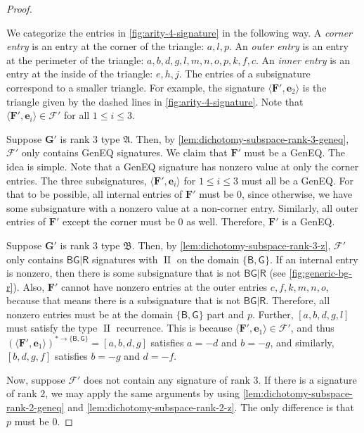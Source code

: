 \documentclass[11pt]{article}
\DeclareMathOperator{\typeii}{II}
\newcommand{\db}{\mathsf{B}}
\newcommand{\dg}{\mathsf{G}}
\newcommand{\dr}{\mathsf{R}}
\newcommand{\geneq}{\textsf{GenEQ}\xspace}
\newcommand{\domres}[1]{
  ^{*\to\{#1\}}
}
\newcommand{\ternarytractgeneq}{$\mathfrak{A}$\xspace}
\newcommand{\ternarytractz}{$\mathfrak{B}$\xspace}
\begin{document}
\begin{proof}
\begin{figure}
\end{figure}
We categorize the entries in  \cref{fig:arity-4-signature} in the following way.
A \textit{corner entry} is an entry at the corner of the triangle: $a, l, p$.
An \textit{outer entry} is an entry at the perimeter of the triangle: 
$a,b,d,g,l,m,n,o,p,k,f,c$.
An \textit{inner entry} is an entry at the inside of the triangle: $e, h , j$.
The entries of a subsignature correspond to a smaller 
triangle. 
For example, the signature $\langle \mathbf{F}', \mathbf{e}_2 \rangle$ is  
the  triangle given by  the dashed lines in \cref{fig:arity-4-signature}. 
Note that $\langle \mathbf{F}', \mathbf{e}_i \rangle \in \mathscr{F}'$ for all $1 \le i \le 3$.


Suppose $\mathbf{G}'$ is rank $3$ type \ternarytractgeneq.
Then, by \cref{lem:dichotomy-subspace-rank-3-geneq}, $\mathscr{F}'$ only contains \geneq signatures.
We claim that $\mathbf{F}'$ must be a \geneq.
The idea is simple. 
Note that a \geneq signature has nonzero value at only the corner entries.
The three subsignatures, $\langle \mathbf{F}', \mathbf{e}_i \rangle$ for $1 \le i \le 3$ must all be a \geneq.
For that to be possible, all internal entries of $\mathbf{F}'$ must be $0$, since otherwise, we have some subsignature with a nonzero value at a non-corner entry.
Similarly, all outer entries of $\mathbf{F}'$ except the corner must be $0$ as well.
Therefore, $\mathbf{F}'$ is a \geneq.

Suppose $\mathbf{G}'$ is rank $3$ type \ternarytractz.
Then, by \cref{lem:dichotomy-subspace-rank-3-z}, $\mathscr{F}'$ only contains $\db \dg | \dr$ signatures with $\typeii$ on the domain $\{\db, \dg\}$.
If an internal entry is nonzero, then there is some subsignature that is not $\db \dg | \dr$ (see \cref{fig:generic-bg-r}).
Also, $\mathbf{F}'$ cannot have nonzero entries at the outer entries $c, f, k, m, n, o$, because that means there is a subsignature that is not $\db \dg | \dr$.
Therefore, all nonzero entries must be at the domain $\{\db, \dg\}$ part and $p$.
Further, $[a, b, d, g, l]$ must satisfy the type $\typeii$ recurrence.
This is because $\langle \mathbf{F}', \mathbf{e}_1 \rangle \in \mathscr{F}'$,
and thus $(\langle \mathbf{F}', \mathbf{e}_1 \rangle)\domres{\db, \dg} = [a, b, d, g]$ satisfies $a = -d$ and $b = -g$, and similarly, $[b, d, g, f]$ satisfies $b = -g$ and $d = -f$.


Now, suppose $\mathscr{F}'$ does not contain any signature of rank $3$.
If there is a signature of rank $2$, we may apply the same arguments by using \cref{lem:dichotomy-subspace-rank-2-geneq} and \cref{lem:dichotomy-subspace-rank-2-z}.
The only difference is that $p$ must be $0$.


\end{proof}
\end{document}
